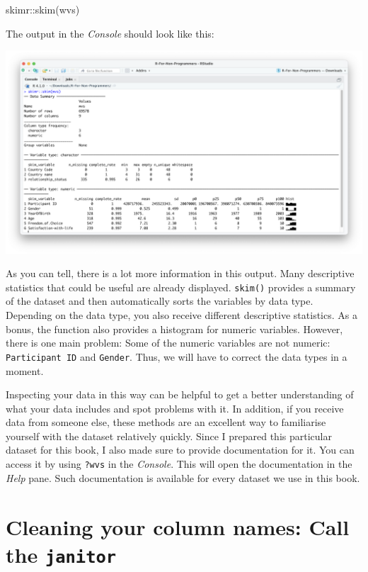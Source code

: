 \documentclass[
  letterpaper,
]{krantz}
\makeatletter
\newenvironment{Shaded}{\begin{snugshade}}{\end{snugshade}}
\newcommand{\FunctionTok}[1]{\textcolor[rgb]{0.28,0.35,0.67}{#1}}
\newcommand{\NormalTok}[1]{\textcolor[rgb]{0.00,0.23,0.31}{#1}}
\newcommand{\SpecialCharTok}[1]{\textcolor[rgb]{0.37,0.37,0.37}{#1}}
\newenvironment{kframe}{%
\medskip{}
\setlength{\fboxsep}{.8em}
 \def\at@end@of@kframe{}%
 \ifinner\ifhmode%
  \def\at@end@of@kframe{\end{minipage}}%
  \begin{minipage}{\columnwidth}%
 \fi\fi%
 \def\FrameCommand##1{\hskip\@totalleftmargin \hskip-\fboxsep
 \colorbox{shadecolor}{##1}\hskip-\fboxsep
     \hskip-\linewidth \hskip-\@totalleftmargin \hskip\columnwidth}%
 \MakeFramed {\advance\hsize-\width
   \@totalleftmargin\z@ \linewidth\hsize
   \@setminipage}}%
 {\par\unskip\endMakeFramed%
 \at@end@of@kframe}
\renewenvironment{Shaded}{\begin{kframe}}{\end{kframe}}
\makeatother
\begin{document}
\begin{Shaded}
\begin{Highlighting}[]
\NormalTok{skimr}\SpecialCharTok{::}\FunctionTok{skim}\NormalTok{(wvs)}
\end{Highlighting}
\end{Shaded}

The output in the \emph{Console} should look like this:

\includegraphics{images/chapter_07_img/02_skimr_output/skimr_output.png}

As you can tell, there is a lot more information in this output. Many
descriptive statistics that could be useful are already displayed.
\texttt{skim()} provides a summary of the dataset and then automatically
sorts the variables by data type. Depending on the data type, you also
receive different descriptive statistics. As a bonus, the function also
provides a histogram for numeric variables. However, there is one main
problem: Some of the numeric variables are not numeric:
\texttt{Participant\ ID} and \texttt{Gender}. Thus, we will have to
correct the data types in a moment.

Inspecting your data in this way can be helpful to get a better
understanding of what your data includes and spot problems with it. In
addition, if you receive data from someone else, these methods are an
excellent way to familiarise yourself with the dataset relatively
quickly. Since I prepared this particular dataset for this book, I also
made sure to provide documentation for it. You can access it by using
\texttt{?wvs} in the \emph{Console}. This will open the documentation in
the \emph{Help} pane. Such documentation is available for every dataset
we use in this book.

\section{\texorpdfstring{Cleaning your column names: Call the
\texttt{janitor}}{Cleaning your column names: Call the janitor}}\label{sec-colnames-cleaning}
\end{document}
